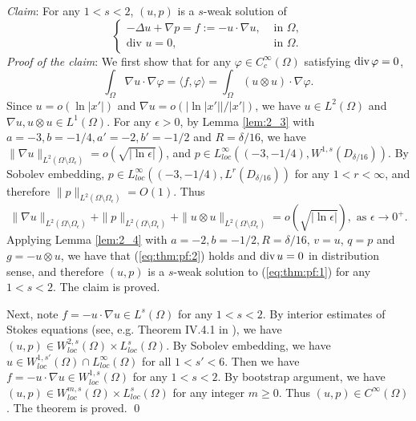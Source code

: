 \documentclass[12pt]{article}
\newcommand{\dive}{{\rm div \hspace{0.05cm} }}
\begin{document}
\medskip

\noindent \emph{Claim}: For any $1<s<2$, $(u, p)$ is a $s$-weak solution of 
\begin{equation}\label{eq:thm:pf:1}
\left\{
\begin{array}{ll}
	-\Delta u+\nabla p=f:=-u\cdot \nabla u, 
	& \textrm{ in }\Omega,\\ 
	\textrm{div } u=0, & \textrm{ in }\Omega.
\end{array}
\right.
\end{equation}
\noindent\emph{Proof of the claim}: 
We first show that for any $\varphi\in C_c^{\infty}(\Omega)$ satisfying $\dive \varphi=0$, 
\begin{equation}\label{eq:thm:pf:2}
	\int_{\Omega}\nabla u\cdot \nabla \varphi= \langle f, \varphi \rangle = \int_{\Omega}(u\otimes u)\cdot \nabla \varphi.
\end{equation}
Since $u=o(\ln |x'|)$ and $\nabla u=o(| \ln |x'||/|x'|)$, we have $u\in L^2(\Omega)$ and $\nabla u, u\otimes u\in L^1(\Omega)$. For any $\epsilon>0$, by Lemma \ref{lem:2_3} with $a=-3, b=-1/4, a'=-2, b'=-1/2$ and $R=\delta/16$, we have $\|\nabla u\|_{L^2(\Omega \setminus\Omega_{\epsilon})}=o(\sqrt{| \ln \epsilon|})$, and $p\in L^{\infty}_{loc}((-3, -1/4), W^{1, s}(D_{\delta/16}))$. By Sobolev embedding, $p\in L^{\infty}_{loc}((-3, -1/4), L^r(D_{\delta/16}))$ for any $1< r<\infty$, and therefore $\|p\|_{L^2(\Omega \setminus\Omega_{\epsilon})}=O(1)$. Thus 
\[
	\|\nabla u\|_{L^2(\Omega \setminus\Omega_{\epsilon})}+\|p\|_{L^2(\Omega \setminus\Omega_{\epsilon})} +\|u\otimes u\|_{L^2(\Omega \setminus\Omega_{\epsilon})}
	= o ( \sqrt{| \ln \epsilon|}), \textrm{ as }\epsilon\to 0^+. 
\]
Applying Lemma \ref{lem:2_4} with $a=-2, b=-1/2, R=\delta/16$, $v=u$, $q=p$ and $g=-u\otimes u$, we have that (\ref{eq:thm:pf:2}) holds and $\dive u=0$ in distribution sense, and therefore $(u, p)$ is a $s$-weak solution to (\ref{eq:thm:pf:1}) for any $1<s<2$. The claim is proved. 

Next, note $f=-u\cdot \nabla u\in L^s(\Omega)$ for any $1<s<2$. By interior estimates of Stokes equations (see, e.g. Theorem IV.4.1 in \cite{Galdi}), we have $(u, p)\in W^{2, s}_{loc}(\Omega)\times L^s_{loc}(\Omega)$. By Sobolev embedding, we have $u\in W^{1, s'}_{loc}(\Omega)\cap L^{\infty}_{loc}(\Omega)$ for all $1<s'<6$. Then we have $f=-u\cdot \nabla u\in W^{1, s}_{loc}(\Omega)$ for any $1<s<2$. By bootstrap argument, we have $(u, p)\in W^{m, s}_{loc}(\Omega)\times L^s_{loc}(\Omega)$ for any integer $m\ge 0$. Thus $(u, p)\in C^{\infty}(\Omega)$. The theorem is proved. 
\qed
\end{document}
